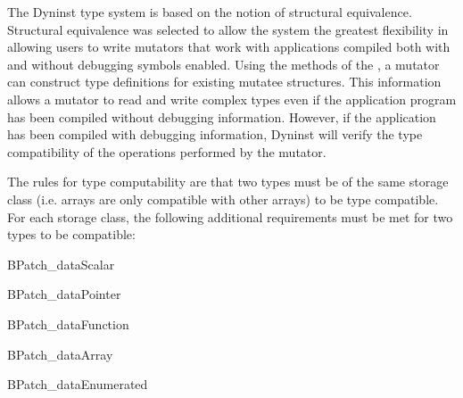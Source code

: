 The Dyninst type system is based on the notion of structural equivalence. Structural
equivalence was selected to allow the system the greatest flexibility in allowing
users to write mutators that work with applications compiled both with and without
debugging symbols enabled. Using the  methods of the , a
mutator can construct type definitions for existing mutatee structures. This information
allows a mutator to read and write complex types even if the application program
has been compiled without debugging information. However, if the application has
been compiled with debugging information, Dyninst will verify the type
compatibility of the operations performed by the mutator.

The rules for type computability are that two types must be of the same storage
class (i.e. arrays are only compatible with other arrays) to be type compatible.
For each storage class, the following additional requirements must be met for two
types to be compatible:

\begin{apient}
BPatch_dataScalar
\end{apient}


\begin{apient}
BPatch_dataPointer
\end{apient}


\begin{apient}
BPatch_dataFunction
\end{apient}


\begin{apient}
BPatch_dataArray
\end{apient}


\begin{apient}
BPatch_dataEnumerated
\end{apient}

